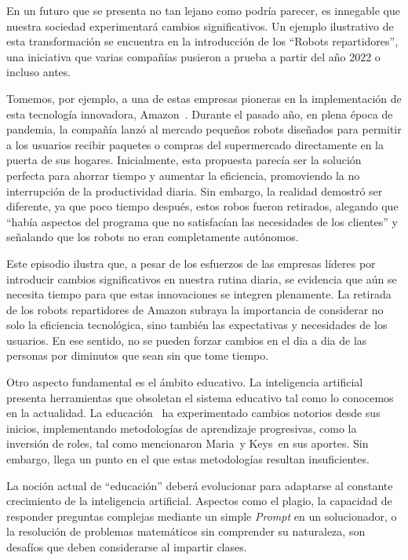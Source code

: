 \documentclass[letterpaper, 12pt]{article}
\newcommand{\memberMaria}{Maria~}
\newcommand{\memberKeys}{Keys~}
\begin{document}
En un futuro que se presenta no tan lejano como podría
parecer, es innegable que nuestra sociedad experimentará
cambios significativos. Un ejemplo ilustrativo de esta
transformación se encuentra en la introducción de los
``Robots repartidores'', una iniciativa que varias
compañías pusieron a prueba a partir del año 2022 o incluso
antes.

Tomemos, por ejemplo, a una de estas empresas pioneras en
la implementación de esta tecnología innovadora,
Amazon~\cite{Erard_2022}. Durante el pasado año, en plena
época de pandemia, la compañía lanzó al mercado pequeños
robots diseñados para permitir a los usuarios recibir
paquetes o compras del supermercado directamente en la
puerta de sus hogares. Inicialmente, esta propuesta parecía
ser la solución perfecta para ahorrar tiempo y aumentar la
eficiencia, promoviendo la no interrupción de la
productividad diaria. Sin embargo, la realidad demostró ser
diferente, ya que poco tiempo después, estos robos fueron
retirados, alegando que ``había aspectos del programa que
no satisfacían las necesidades de los clientes'' y
señalando que los robots no eran completamente autónomos.

Este episodio ilustra que, a pesar de los esfuerzos de las
empresas líderes por introducir cambios significativos en
nuestra rutina diaria, se evidencia que aún se necesita
tiempo para que estas innovaciones se integren plenamente.
La retirada de los robots repartidores de Amazon subraya la
importancia de considerar no solo la eficiencia
tecnológica, sino también las expectativas y necesidades de
los usuarios. En ese sentido, no se pueden forzar cambios
en el dia a dia de las personas por diminutos que sean sin
que tome tiempo.

Otro aspecto fundamental es el ámbito educativo. La
inteligencia artificial presenta herramientas que obsoletan
el sistema educativo tal como lo conocemos en la
actualidad. La educación~\cite{educacion_evolución} ha
experimentado cambios notorios desde sus inicios,
implementando metodologías de aprendizaje progresivas, como
la inversión de roles, tal como mencionaron \memberMaria y
\memberKeys en sus aportes. Sin embargo, llega un punto en
el que estas metodologías resultan insuficientes.

La noción actual de ``educación'' deberá evolucionar para
adaptarse al constante crecimiento de la inteligencia
artificial. Aspectos como el plagio, la capacidad de
responder preguntas complejas mediante un simple
\textit{Prompt} en un solucionador, o la resolución de
problemas matemáticos sin comprender su naturaleza, son
desafíos que deben considerarse al impartir clases.
\end{document}
